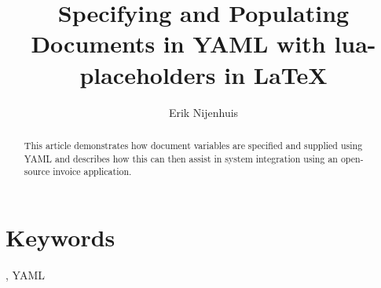 \documentclass[english]{ltugboat}
\title{Specifying and Populating Documents in YAML with lua-placeholders in LaTeX}
\author{Erik Nijenhuis}
\begin{document}
    \maketitle

    \begin{abstract}
    This article demonstrates how document variables are specified and supplied using YAML and describes how this can then assist in system integration using an open-source invoice application.
\end{abstract}

    \section*{Keywords}
    \LuaLaTeX, YAML

    

    

    

    

    

    

    \makesignature
\end{document}
